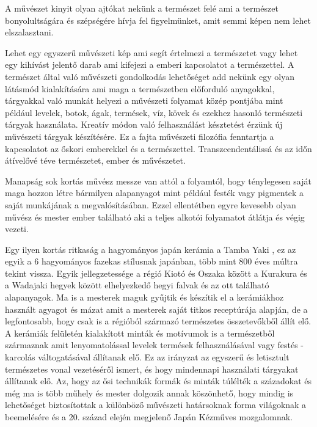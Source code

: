 \documentclass[fontsize=12pt, appendixprefix=true]{scrreprt}
\begin{document}
A művészet kinyit olyan ajtókat nekünk a természet felé ami a természet  bonyolultságára és szépségére hívja fel figyelmünket, amit semmi képen nem lehet elszalasztani.

Lehet egy egyszerű művészeti kép ami segít értelmezi a természetet vagy lehet egy kihívást jelentő darab ami kifejezi a emberi kapcsolatot a természettel.\cite{art_nature} 
A természet által való művészeti gondolkodás lehetőséget add nekünk egy olyan látásmód kialakítására ami maga a természetben előforduló anyagokkal, tárgyakkal való munkát helyezi a művészeti folyamat közép pontjába mint például levelek, botok, ágak, termések, víz, kövek és ezekhez hasonló természeti tárgyak használata.
Kreatív módon való felhasználást késztetést érzünk új művészeti tárgyak készítésére.
\cite{meller2002textile}
Ez a fajta művészeti filozófia fenntartja a kapcsolatot az őskori emberekkel és a természettel. Transzcendentálissá és az időn átívelővé téve természetet, ember és művészetet.

Manapság sok kortás művész messze van attól a folyamtól, hogy ténylegesen saját maga hozzon létre bármilyen alapanyagot mint például festék vagy pigmentek a saját munkájának a megvalósításában. Ezzel ellentétben egyre kevesebb olyan művész és mester ember található aki a teljes alkotói folyamatot átlátja és végig vezeti.

\vspace{3 mm}
Egy ilyen kortás ritkaság a hagyományos japán kerámia a Tamba Yaki \cite{tambayaki}, ez az  egyik a 6 hagyományos fazekas stílusnak japánban, több mint 800 éves múltra tekint vissza. Egyik jellegzetessége a régió Kiotó és Oszaka között a Kurakura és a Wadajaki hegyek között elhelyezkedő hegyi falvak és az ott található alapanyagok. Ma is a mesterek maguk gyűjtik és készítik el a kerámiákhoz használt agyagot és mázat amit a mesterek saját titkos receptúrája alapján, de a legfontosabb, hogy csak is a régióból származó természetes összetevőkből állít elő. A kerámiák felületén kialakított minták és motívumok is a természetből származnak amit lenyomatolással levelek termések felhasználásával vagy festés - karcolás váltogatásával állítanak elő. Ez az irányzat az egyszerű és letisztult természetes vonal vezetéséről ismert, és hogy mindennapi használati tárgyakat állítanak elő. Az, hogy az ősi technikák formák és minták túlélték  a századokat és még ma is több műhely és mester dolgozik annak köszönhető, hogy mindig is lehetőséget biztosítottak a különböző művészeti határsoknak forma világoknak a beemelésére és a 20. század elején megjelenő Japán Kézműves mozgalomnak.
\end{document}
